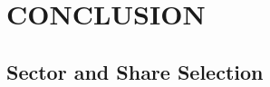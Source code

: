 \documentclass[10pt,twocolumn]{witseiepaper}
\begin{document}
\section{CONCLUSION}


%



\newpage

\begin{appendix}
	
\section{Sector and Share Selection}


\end{appendix}

\end{document}
